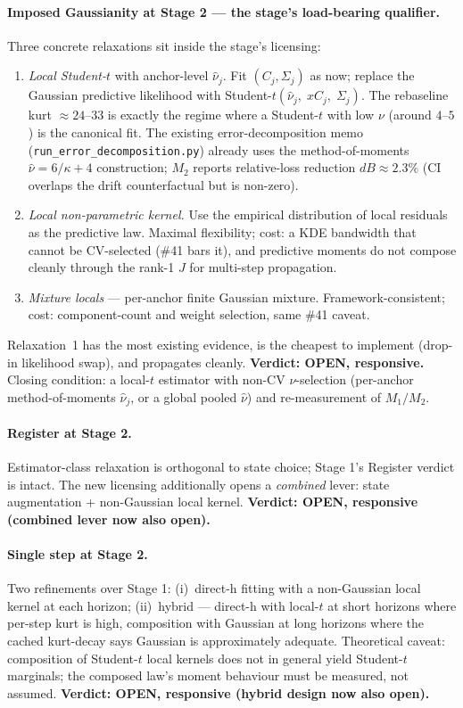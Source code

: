 \documentclass[11pt]{article}
\newcommand{\Sj}{\Sigma_{j}}
\newcommand{\Cj}{C_{j}}
\newcommand{\nuhat}{\hat\nu}
\begin{document}
\paragraph{Imposed Gaussianity at Stage 2 --- the stage's
load-bearing qualifier.} Three concrete relaxations sit inside the
stage's licensing:
\begin{enumerate}[leftmargin=2em]
  \item \emph{Local Student-\(t\)} with anchor-level \(\nuhat_j\).
  Fit \((\Cj, \Sj)\) as now; replace the Gaussian predictive
  likelihood with Student-\(t(\nuhat_j,\; x\Cj,\; \Sj)\). The
  rebaseline kurt \(\approx 24\)--\(33\) is exactly the regime where
  a Student-\(t\) with low \(\nu\) (around \(4\)--\(5\)) is the
  canonical fit. The existing error-decomposition memo
  (\texttt{run\_error\_decomposition.py}) already uses the
  method-of-moments \(\nuhat = 6/\kappa + 4\) construction; \(M_2\)
  reports relative-loss reduction \(dB \approx 2.3\%\) (CI overlaps
  the drift counterfactual but is non-zero).
  \item \emph{Local non-parametric kernel.} Use the empirical
  distribution of local residuals as the predictive law. Maximal
  flexibility; cost: a KDE bandwidth that cannot be CV-selected
  (\#41 bars it), and predictive moments do not compose cleanly
  through the rank-1 \(J\) for multi-step propagation.
  \item \emph{Mixture locals} --- per-anchor finite Gaussian
  mixture. Framework-consistent; cost: component-count and weight
  selection, same \#41 caveat.
\end{enumerate}
Relaxation~1 has the most existing evidence, is the cheapest to
implement (drop-in likelihood swap), and propagates cleanly.
\textbf{Verdict: OPEN, responsive.} Closing condition: a local-\(t\)
estimator with non-CV \(\nu\)-selection (per-anchor
method-of-moments \(\nuhat_j\), or a global pooled \(\hat\nu\)) and
re-measurement of \(M_1/M_2\).

\paragraph{Register at Stage 2.} Estimator-class relaxation is
orthogonal to state choice; Stage 1's Register verdict is intact.
The new licensing additionally opens a \emph{combined} lever: state
augmentation + non-Gaussian local kernel. \textbf{Verdict: OPEN,
responsive (combined lever now also open).}

\paragraph{Single step at Stage 2.} Two refinements over Stage 1:
(i)~direct-h fitting with a non-Gaussian local kernel at each
horizon; (ii)~hybrid --- direct-h with local-\(t\) at short horizons
where per-step kurt is high, composition with Gaussian at long
horizons where the cached kurt-decay says Gaussian is approximately
adequate. Theoretical caveat: composition of Student-\(t\) local
kernels does not in general yield Student-\(t\) marginals; the
composed law's moment behaviour must be measured, not assumed.
\textbf{Verdict: OPEN, responsive (hybrid design now also open).}
\end{document}
